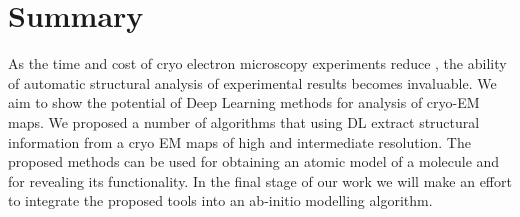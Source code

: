 \section{Summary}
As the time and cost of cryo electron microscopy experiments reduce , the ability of automatic structural analysis of experimental results becomes invaluable. 
We aim to show the potential of Deep Learning methods for analysis of cryo-EM maps.
We proposed a number of algorithms that using DL extract structural information from a cryo EM maps of high and intermediate resolution.
The proposed methods can be used for obtaining an atomic model of a molecule and for revealing its functionality.
In the final stage of our  work we will make an effort to integrate the proposed tools into an ab-initio modelling algorithm. 